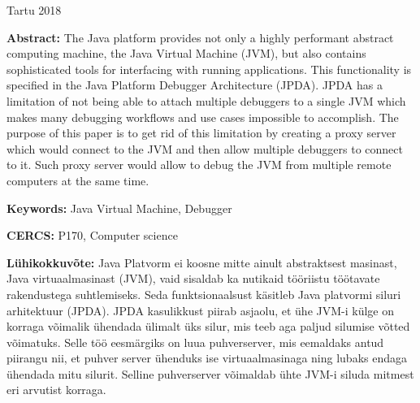 \documentclass{style/bachelor-thesis}
\begin{document}
\vfill
\centerline{Tartu 2018}


\pagebreak
\listoftodos[Todos]

\pagebreak

\noindent\textbf{\large \articleName}
\vspace*{3ex}
\begin{flushleft}
  \textbf{Abstract:} 
  The Java platform provides not only a highly performant abstract computing machine, the Java Virtual Machine (JVM), but also contains sophisticated tools for interfacing with running applications. 
  This functionality is specified in the Java Platform Debugger Architecture (JPDA).
  JPDA has a limitation of not being able to attach multiple debuggers to a single JVM which makes many debugging workflows and use cases impossible to accomplish.
  The purpose of this paper is to get rid of this limitation by creating a proxy server which would connect to the JVM and then allow multiple debuggers to connect to it. 
  Such proxy server would allow to debug the JVM from multiple remote computers at the same time.  
\end{flushleft}


\vspace*{3ex}
\begin{flushleft}
  \textbf{Keywords:} Java Virtual Machine, Debugger
\end{flushleft}
\vspace*{3ex}

\noindent\textbf{CERCS:} P170, Computer science

\vspace*{5ex}
\noindent\textbf{\large \articleNameEE}
\vspace*{3ex}

\begin{flushleft}
  \textbf{Lühikokkuvõte:} 
  Java Platvorm ei koosne mitte ainult abstraktsest masinast, Java virtuaalmasinast (JVM), vaid sisaldab ka nutikaid tööriistu töötavate rakendustega suhtlemiseks.
  Seda funktsionaalsust käsitleb Java platvormi siluri arhitektuur (JPDA).
  JPDA kasulikkust piirab asjaolu, et ühe JVM-i külge on korraga võimalik ühendada ülimalt üks silur, mis teeb aga paljud silumise võtted võimatuks.
  Selle töö eesmärgiks on luua puhverserver, mis eemaldaks antud piirangu nii, et puhver server ühenduks ise virtuaalmasinaga ning lubaks endaga ühendada mitu silurit.
  Selline puhverserver võimaldab ühte JVM-i siluda mitmest eri arvutist korraga.
\end{flushleft}
\vspace*{3ex}
\end{document}
